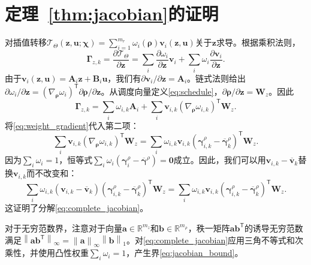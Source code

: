 \documentclass[journal]{IEEEtran}
\newcommand{\norm}[1]{\left\lVert #1\right\rVert}
\newcommand{\T}{\mathsf T}
\newcommand{\1}{\bm 1}
\begin{document}
\section{定理~\ref{thm:jacobian}的证明}
对插值转移$\mathcal T_\Theta(\bm z,\bm u;\bm\chi)=\sum_{i=1}^{m_r}\omega_i(\bm\rho)\bm v_i(\bm z,\bm u)$关于$\bm z$求导。根据乘积法则，
\begin{equation*}
\bm\Gamma_{z,k}=\frac{\partial\mathcal T_\Theta}{\partial\bm z}
=\sum_i\frac{\partial\omega_i}{\partial\bm z}\bm v_i
+\sum_i\omega_i\frac{\partial\bm v_i}{\partial\bm z}.
\end{equation*}
由于$\bm v_i(\bm z,\bm u)=\bm A_i\bm z+\bm B_i\bm u$，我们有$\partial\bm v_i/\partial\bm z=\bm A_i$。链式法则给出$\partial\omega_i/\partial\bm z=(\nabla_{\bm\rho}\omega_i)^\T\partial\bm\rho/\partial\bm z$。从调度向量定义\eqref{eq:schedule}，$\partial\bm\rho/\partial\bm z=\bm W_z$。因此
\begin{equation*}
\bm\Gamma_{z,k}=\sum_i\omega_{i,k}\bm A_i+
\sum_i\bm v_{i,k}
(\nabla_{\bm\rho}\omega_{i,k})^\T\bm W_z.
\end{equation*}
将\eqref{eq:weight_gradient}代入第二项：
\begin{equation*}
\sum_i\bm v_{i,k}
(\nabla_{\bm\rho}\omega_{i,k})^\T\bm W_z
=\sum_i\omega_{i,k}\bm v_{i,k}
(\bm\gamma_{i,k}^{\rho}-\overline{\bm\gamma}_k^{\rho})^\T\bm W_z.
\end{equation*}
因为$\sum_i\omega_i=1$，恒等式$\sum_i\omega_i(\bm\gamma_i^{\rho}-\overline{\bm\gamma}^{\rho})=\bm 0$成立。因此，我们可以用$\bm v_{i,k}-\overline{\bm v}_k$替换$\bm v_{i,k}$而不改变和：
\begin{equation*}
\sum_i\omega_{i,k}(\bm v_{i,k}-\overline{\bm v}_k)
(\bm\gamma_{i,k}^{\rho}-\overline{\bm\gamma}_k^{\rho})^\T\bm W_z
=\sum_i\omega_{i,k}\bm v_{i,k}
(\bm\gamma_{i,k}^{\rho}-\overline{\bm\gamma}_k^{\rho})^\T\bm W_z.
\end{equation*}
这证明了分解\eqref{eq:complete_jacobian}。

对于无穷范数界，注意对于向量$\bm a\in\mathbb R^{m_z}$和$\bm b\in\mathbb R^{m_\rho}$，秩一矩阵$\bm a\bm b^\T$的诱导无穷范数满足$\norm{\bm a\bm b^\T}_\infty=\norm{\bm a}_\infty\norm{\bm b}_1$。对\eqref{eq:complete_jacobian}应用三角不等式和次乘性，并使用凸性权重$\sum_i\omega_i=1$，产生界\eqref{eq:jacobian_bound}。
\end{document}

